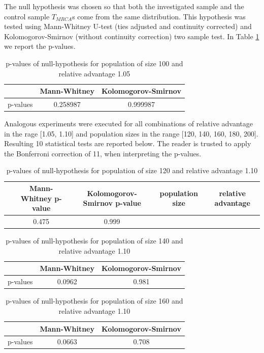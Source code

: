 \documentclass{l4proj}
\begin{document}
The null hypothesis was chosen so that both the investigated sample and the control sample $T_{MRCA}$s come from the same distribution. This hypothesis was tested using Mann-Whitney U-test (ties adjusted and continuity corrected) and Kolomogorov-Smirnov (without continuity correction) two sample test. In Table \ref{nullHypothesisTable} we report the p-values.

\begin{table}[]
    \centering
    \begin{tabular}{|c|c|c|}
    \hline
    & Mann-Whitney & Kolomogorov-Smirnov \\ \hline
    p-values & 0.258987 & 0.999987 \\ \hline
    \end{tabular}
    \caption{p-values of null-hypothesis for population of size 100 and relative advantage 1.05}
    \label{nullHypothesisTable}
\end{table}

Analogous experiments were executed for all combinations of relative advantage in the rage [1.05, 1.10] and population sizes in the range [120, 140, 160, 180, 200]. Resulting 10 statistical tests are reported below. The reader is trusted to apply the Bonferroni correction of 11, when interpreting the p-values.

\begin{table}[]
    \centering
    \begin{tabular}{|c|c|c|c|c|}
    \hline
    & Mann-Whitney p-value & Kolomogorov-Smirnov p-value & population size & relative advantage  \\ \hline
     & 0.475 & 0.999 \\ \hline
    \end{tabular}
    \caption{p-values of null-hypothesis for population of size 120 and relative advantage 1.10}
\end{table}

\begin{table}[]
    \centering
    \begin{tabular}{|c|c|c|}
    \hline
    & Mann-Whitney & Kolomogorov-Smirnov \\ \hline
    p-values & 0.0962 & 0.981 \\ \hline
    \end{tabular}
    \caption{p-values of null-hypothesis for population of size 140 and relative advantage 1.10}
\end{table}

\begin{table}[]
    \centering
    \begin{tabular}{|c|c|c|}
    \hline
    & Mann-Whitney & Kolomogorov-Smirnov \\ \hline
    p-values & 0.0663 & 0.708 \\ \hline
    \end{tabular}
    \caption{p-values of null-hypothesis for population of size 160 and relative advantage 1.10}
\end{table}
\end{document}
